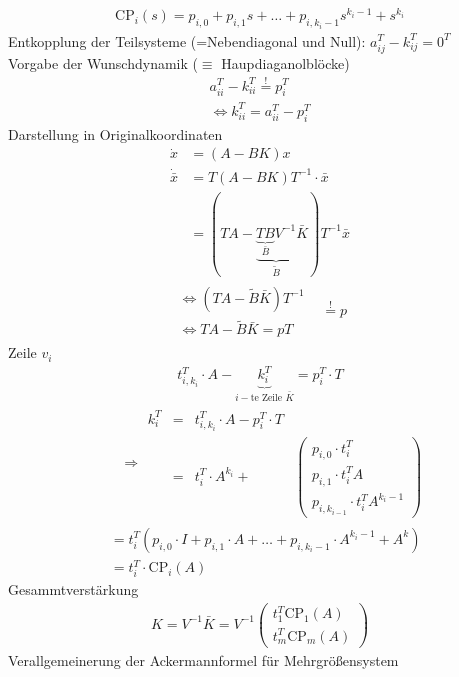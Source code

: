 \documentclass[ngerman]{tudscrreprt}
\begin{document}
\begin{align*}
\text{CP}_i(s) = p_{i,0} + p_{i,1}s + \dots + p_{i,k_i-1}s^{k_i-1} + s^{k_i}
\end{align*}Entkopplung der Teilsysteme (=Nebendiagonal und Null): $a_{ij}^T - k_{ij}^T = 0^T$\\ 
Vorgabe der Wunschdynamik ($\equiv$ Haupdiaganolblöcke)
\begin{align*}
a_{ii}^T - k_{ii}^T \overset{!}{=} p_i^T\\ 
\iff k_{ii}^T = a_{ii}^T - p_i^T
\end{align*}Darstellung in Originalkoordinaten \begin{align*}
\dot x & = (A - BK)x\\ 
\dot{\bar x} &= T (A - BK)T^{-1} \cdot \bar x\\
&= (TA - \underbrace{ \underbrace{TB}_{\bar B}V^{-1} }_{\tilde B} \bar K )T^{-1} \bar x
\end{align*}
\begin{align*}
\begin{matrix}
\iff (TA - \tilde B \bar K)T^{-1} \\ 
\iff TA - \tilde B \bar K = pT 
\end{matrix}&\overset{!}{=} p
\end{align*}
Zeile $v_i$ \begin{align*} 
t_{i,k_i}^T \cdot A - \underbrace{k_i^T}_{i-\text{te Zeile }\bar K} = p_i^T\cdot T 
\end{align*}
\begin{align*}
\qquad \Rightarrow  \begin{matrix}k_i^T &=&t_{i,k_i}^T \cdot A - p_i^T \cdot T &\\ &=&t_i^T\cdot A^{k_i} + &\begin{pmatrix}
p_{i,0}\cdot t_i^T\\ p_{i,1}\cdot t_i^T A\\ p_{i,k_{i-1}}\cdot t_i^TA^{k_i-1}
\end{pmatrix}  \end{matrix}
\end{align*}
\begin{align*}
&=t_i^T(p_{i,0}\cdot I + p_{i,1}\cdot A + \dots + p_{i,k_i-1} \cdot A^{k_i -1} + A^k)\\ 
&=t_i^T \cdot \text{CP}_i(A)
\end{align*}Gesammtverstärkung 
\begin{align*}
K = V^{-1} \bar K = V^{-1} \begin{pmatrix} t_1^T \text{CP}_1(A)\\ t_m^T \text{CP}_m(A) \end{pmatrix}
\end{align*}
Verallgemeinerung der Ackermannformel für Mehrgrößensystem
\end{document}

